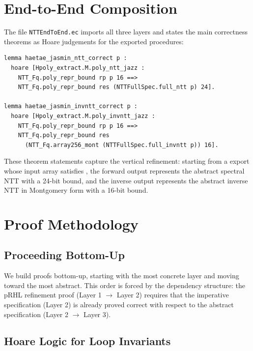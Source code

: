 \section{End-to-End Composition}

The file \texttt{NTTEndToEnd.ec} imports all three layers and states the
main correctness theorems as Hoare judgements for the exported \jasmin{}
procedures:

\begin{lstlisting}[language=EasyCrypt,
  caption={End-to-end theorem statement in NTTEndToEnd.ec},
  label={lst:e2e}]
lemma haetae_jasmin_ntt_correct p :
  hoare [Hpoly_extract.M.poly_ntt_jazz :
    NTT_Fq.poly_repr_bound rp p 16 ==>
    NTT_Fq.poly_repr_bound res (NTTFullSpec.full_ntt p) 24].

lemma haetae_jasmin_invntt_correct p :
  hoare [Hpoly_extract.M.poly_invntt_jazz :
    NTT_Fq.poly_repr_bound rp p 16 ==>
    NTT_Fq.poly_repr_bound res
      (NTT_Fq.array256_mont (NTTFullSpec.full_invntt p)) 16].
\end{lstlisting}

These theorem statements capture the vertical refinement: starting from a
\jasmin{} export whose input array satisfies , the
forward output represents the abstract spectral NTT with a 24-bit bound, and
the inverse output represents the abstract inverse NTT in Montgomery form
with a 16-bit bound.

\section{Proof Methodology}

\subsection{Proceeding Bottom-Up}

We build proofs bottom-up, starting with the most concrete layer and
moving toward the most abstract.  This order is forced by the dependency
structure: the pRHL refinement proof (Layer 1 $\to$ Layer 2) requires
that the imperative specification (Layer 2) is already proved correct with
respect to the abstract specification (Layer 2 $\to$ Layer 3).

\subsection{Hoare Logic for Loop Invariants}

